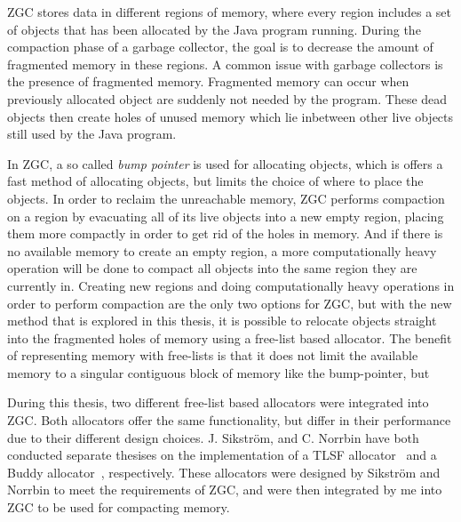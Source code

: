 ZGC stores data in different regions of memory, where every region includes a set of objects that has been allocated by the Java program running. During the compaction phase of a garbage collector, the goal is to decrease the amount of fragmented memory in these regions. A common issue with garbage collectors is the presence of fragmented memory. Fragmented memory can occur when previously allocated object are suddenly not needed by the program. These dead objects then create holes of unused memory which lie inbetween other live objects still used by the Java program. 

In ZGC, a so called \textit{bump pointer} is used for allocating objects, which is offers a fast method of allocating objects, but limits the choice of where to place the objects. In order to reclaim the unreachable memory, ZGC performs compaction on a region by evacuating all of its live objects into a new empty region, placing them more compactly in order to get rid of the holes in memory. And if there is no available memory to create an empty region, a more computationally heavy operation will be done to compact all objects into the same region they are currently in. Creating new regions and doing computationally heavy operations in order to perform compaction are the only two options for ZGC, but with the new method that is explored in this thesis, it is possible to relocate objects straight into the fragmented holes of memory using a free-list based allocator. The benefit of representing memory with free-lists is that it does not limit the available memory to a singular contiguous block of memory like the bump-pointer, but 

During this thesis, two different free-list based allocators were integrated into ZGC. Both allocators offer the same functionality, but differ in their performance due to their different design choices. J. Sikström, and C. Norrbin have both conducted separate thesises on the implementation of a TLSF allocator~\cite{joel} and a Buddy allocator~\cite{casper}, respectively. These allocators were designed by Sikström and Norrbin to meet the requirements of ZGC, and were then integrated by me into ZGC to be used for compacting memory. 
